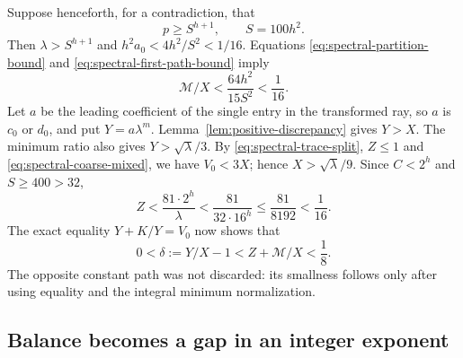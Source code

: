 Suppose henceforth, for a contradiction, that
\begin{equation}\label{eq:spectral-threshold-assumption}
 p\geqslant S^{h+1},\qquad S=100h^2.
\end{equation}
Then $\lambda>S^{h+1}$ and $h^2a_0<4h^2/S^2<1/16$.
Equations \eqref{eq:spectral-partition-bound} and
\eqref{eq:spectral-first-path-bound} imply
\begin{equation}\label{eq:spectral-coarse-mixed}
 \mathcal M/X<\frac{64h^2}{15S^2}<\frac1{16}.
\end{equation}
Let $a$ be the leading coefficient of the single entry in the
transformed ray, so $a$ is $c_0$ or $d_0$, and put $Y=a\lambda^m$.
Lemma~\ref{lem:positive-discrepancy} gives $Y>X$.
The minimum ratio also gives $Y>\sqrt\lambda/3$.
By \eqref{eq:spectral-trace-split}, $Z\leqslant1$ and
\eqref{eq:spectral-coarse-mixed}, we have $V_0<3X$; hence
$X>\sqrt\lambda/9$. Since $C<2^h$ and $S\geqslant400>32$,
\begin{equation}\label{eq:spectral-opposite-constant}
 Z<\frac{81\cdot2^h}{\lambda}
 <\frac{81}{32\cdot16^h}\leqslant\frac{81}{8192}<\frac1{16}.
\end{equation}
The exact equality $Y+K/Y=V_0$ now shows that
\begin{equation}\label{eq:spectral-small-delta}
 0<\delta:=Y/X-1<Z+\mathcal M/X<\frac18.
\end{equation}
The opposite constant path was not discarded: its smallness follows
only after using equality and the integral minimum normalization.

\subsection{Balance becomes a gap in an integer exponent}


